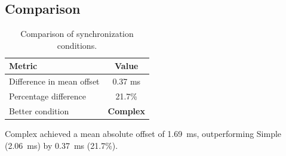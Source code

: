 \subsection*{Comparison}

\begin{table}[h!]
\centering
\begin{tabular}{|l|c|}
\hline
Metric & Value \\
\hline
Difference in mean offset & 0.37 ms \\
Percentage difference & 21.7\% \\
Better condition & \textbf{Complex} \\
\hline
\end{tabular}
\caption{Comparison of synchronization conditions.}
\label{tab:sync_comparison}
\end{table}

Complex achieved a mean absolute offset of 1.69~ms, outperforming Simple (2.06~ms) by 0.37~ms (21.7\%).
